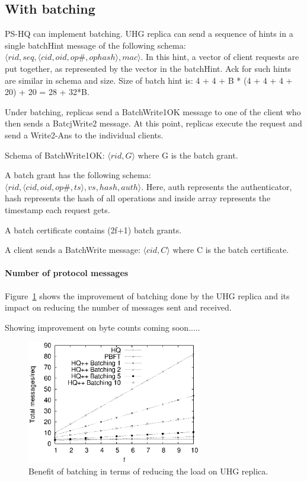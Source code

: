 \documentclass[twocolumn,10pt]{article}
\begin{document}
\subsection{With batching}

PS-HQ can implement batching. UHG replica can send a sequence of hints in a single batchHint
message of the following schema: $\langle rid, seq, \langle cid, oid, op\#, ophash\rangle, 
mac\rangle$. In this hint, a vector of client requests are put together, as represented by the
vector in the batchHint. Ack for such hints are similar in schema and size. Size of
batch hint is: 4 + 4 + B * (4 + 4 + 4 + 20) + 20 = 28 + 32*B.

Under batching, replicas send a BatchWrite1OK message to one of the client who then sends a
BatcjWrite2 message. 
At this point, replicas execute the request and send a Write2-Ans to the individual
clients. 

Schema of BatchWrite1OK: $\langle rid, G \rangle$ where G is the batch grant. 

A batch grant has the following schema:
\\ $\langle rid, \langle cid, oid, op\#, ts\rangle, vs, hash,
auth\rangle$. Here, auth represents the authenticator, hash represents the hash of all operations
and inside array represents the timestamp each request gets. 

A batch certificate contains (2f+1) batch grants.

A client sends a BatchWrite message: $\langle cid, C\rangle$ where C is the batch certificate.


\paragraph{Number of protocol messages}

Figure~\ref{fig:compare_msg_counts_batching} shows the improvement of batching done
by the UHG replica and its impact on reducing the number of messages sent and
received.

Showing improvement on byte counts coming soon.....

\begin{figure}
\centering
\includegraphics[width=3.0in]{analysis/message-counts-batching.ps}
\caption{Benefit of batching in terms of reducing the load on UHG replica.}
\label{fig:compare_msg_counts_batching}
\end{figure}
\fi
\end{document}
